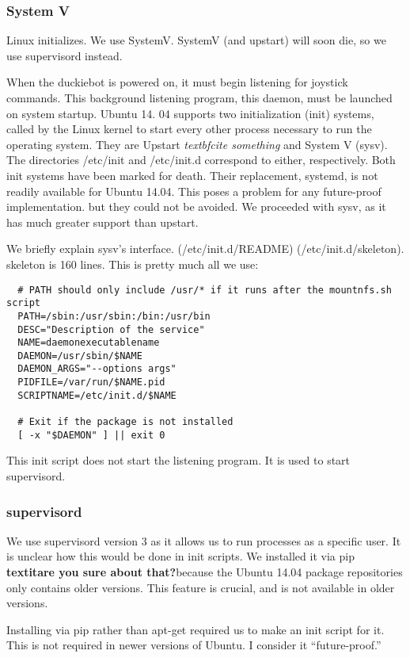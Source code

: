 \documentclass[titlepage]{article}
\begin{document}
\subsubsection{System V}
Linux initializes. We use SystemV. SystemV (and upstart) will soon die, so we use supervisord instead. 

When the duckiebot is powered on, it must begin listening for joystick commands. This background listening program, this daemon, must be launched on system startup. Ubuntu 14. 04 supports two initialization (init) systems, called by the Linux kernel to start every other process necessary to run the operating system. They are Upstart \textit{textbf{cite something}} and System V (sysv). The directories /etc/init and /etc/init.d correspond to either, respectively. Both init systems have been marked for death. Their replacement, systemd, is not readily available for Ubuntu 14.04. This poses a problem for any future-proof implementation. but they could not be avoided. We proceeded with sysv, as it has much greater support than upstart. 

We briefly explain sysv's interface. (/etc/init.d/README) (/etc/init.d/skeleton).  skeleton is 160 lines. 
This is pretty much all we use:

\begin{lstlisting}
  # PATH should only include /usr/* if it runs after the mountnfs.sh script
  PATH=/sbin:/usr/sbin:/bin:/usr/bin
  DESC="Description of the service"
  NAME=daemonexecutablename
  DAEMON=/usr/sbin/$NAME
  DAEMON_ARGS="--options args"
  PIDFILE=/var/run/$NAME.pid
  SCRIPTNAME=/etc/init.d/$NAME
 
  # Exit if the package is not installed
  [ -x "$DAEMON" ] || exit 0
\end{lstlisting}

This init script does not start the listening program. It is used to start supervisord. 
\subsubsection{supervisord}

We use supervisord version 3 as it allows us to run processes as a specific user. It is unclear how this would be done in init scripts. We installed it via pip \textbf{textit{are you sure about that?}}because the Ubuntu 14.04 package repositories only contains older versions. This feature is crucial, and is not available in older versions. 

Installing via pip rather than apt-get required us to make an init script for it. This is not required in newer versions of Ubuntu. I consider it ``future-proof.''
\end{document}

